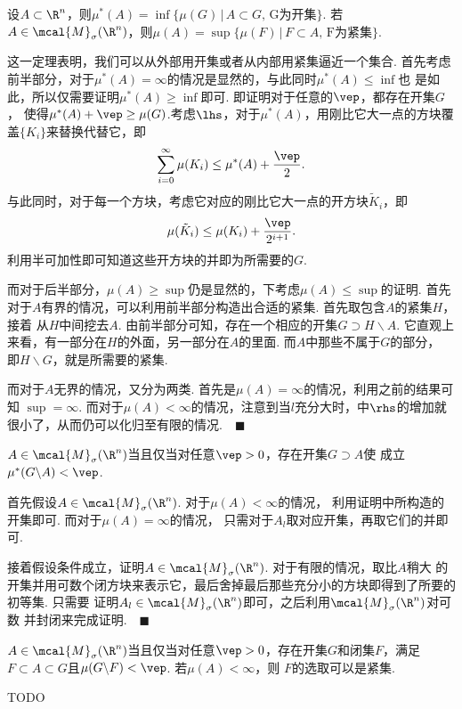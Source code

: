  \begin{thm}
    \label{thm: Borel正则性}
    设$A\subset\R^n$，则$\mu^*(A)=\inf\{\mu(G)\,|\,A\subset G,\,
    \text{G为开集}\}$. 若$A\in\mcal{M}_\sigma(\R^n)$，则$\mu(A)=
    \sup\{\mu(F)\,|\,F\subset A,\,\text{F为紧集}\}$.
  \end{thm}
  \remark
    这一定理表明，我们可以从外部用开集或者从内部用紧集逼近一个集合.
  \proof
    首先考虑前半部分，对于$\mu^*(A)=\infty$的情况是显然的，与此同时$\mu^*(A)\le\inf$也
    是如此，所以仅需要证明$\mu^*(A)\ge\inf$即可. 即证明对于任意的$\vep$，都存在开集$G$，
    使得$\mu^*(A)+\vep\ge\mu(G)$.考虑$\lhs$，对于$\mu^*(A)$，用刚比它大一点的方块覆
    盖$\{K_i\}$来替换代替它，即
    \[
      \sum_{i=0}^\infty\mu(K_i) \le \mu^*(A) + \frac{\vep}{2}.
    \]
    与此同时，对于每一个方块，考虑它对应的刚比它大一点的开方块$\tilde{K}_i$，即
    \[
      \mu(\tilde{K}_i) \le \mu(K_i) + \frac{\vep}{2^{i+1}}.
    \]
    利用半可加性即可知道这些开方块的并即为所需要的$G$.\par
    而对于后半部分，$\mu(A)\ge\sup$仍是显然的，下考虑$\mu(A)\le\sup$的证明. 首先
    对于$A$有界的情况，可以利用前半部分构造出合适的紧集. 首先取包含$A$的紧集$H$，接着
    从$H$中间挖去$A$. 由前半部分可知，存在一个相应的开集$G\supset H\backslash A$.
    它直观上来看，有一部分在$H$的外面，另一部分在$A$的里面. 而$A$中那些不属于$G$的部分，
    即$H\backslash G$，就是所需要的紧集. \par
    而对于$A$无界的情况，又分为两类. 首先是$\mu(A)=\infty$的情况，利用之前的结果可知
    $\sup=\infty$. 而对于$\mu(A)<\infty$的情况，注意到当$l$充分大时，中$\rhs$的增加就很小了，从而仍可以化归至有限的情况.$\quad\blacksquare$

  \begin{thm}
    $A\in\mcal{M}_\sigma(\R^n)$当且仅当对任意$\vep>0$，存在开集$G\supset A$使
    成立$\mu^*(G\backslash A)<\vep$.
  \end{thm}
  \proof
    首先假设$A\in\mcal{M}_\sigma(\R^n)$. 对于$\mu(A)<\infty$的情况，
    利用证明中所构造的开集即可. 而对于$\mu(A)=\infty$的情况，
    只需对于$A_l$取对应开集，再取它们的并即可.\par
    接着假设条件成立，证明$A\in\mcal{M}_\sigma(\R^n)$. 对于有限的情况，取比$A$稍大
    的开集并用可数个闭方块来表示它，最后舍掉最后那些充分小的方块即得到了所要的初等集. 只需要
    证明$A_l\in\mcal{M}_\sigma(\R^n)$即可，之后利用$\mcal{M}_\sigma(\R^n)$对可数
    并封闭来完成证明.$\quad\blacksquare$

  \begin{thm}
    \label{thm: sigma-测度、夹逼}
    $A\in\mcal{M}_\sigma(\R^n)$当且仅当对任意$\vep>0$，存在开集$G$和闭集$F$，满足
    $F\subset A\subset G$且$\mu(G\backslash F)<\vep$. 若$\mu(A)<\infty$，则
    $F$的选取可以是紧集.
  \end{thm}
  \proof
    TODO

